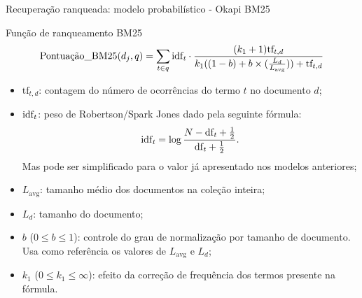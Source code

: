 \documentclass[%
  10pt,%
  aspectratio = 169,%
  compress,%
  t,%
]{beamer}%
\begin{document}
    \begin{frame}[fragile = singleslide]{}{Recuperação ranqueada: modelo probabilístico - Okapi BM25}
        \begin{block}{Função de ranqueamento BM25}
            \begin{equation}
                \label{eq:okapi-bm25}
        		\text{Pontuação\_BM25}(d_j, q) = \sum_{t \in q} \text{idf}_{\text{\textit{t}}} 
        		\cdot
        		\frac{(k_1 + 1) \text{tf}_{t,d}}{k_1((1-b)+b \times (\frac{L_d}{L_{\text{avg}}})) + \text{tf}_{t,d}} 
            \end{equation}
        \end{block}
        \begin{itemize}
            \item $\text{tf}_{t,d}$: contagem do número de ocorrências do termo $t$ no documento $d$;
            
            \item $\text{idf}_{\text{\textit{t}}}$: peso de Robertson/Spark Jones dado pela seguinte fórmula:
            \begin{equation}
                \label{eq:peso-rsj-adaptado}
        		\text{idf}_{\text{\textit{t}}} = \log{\frac{N-\text{df}_{\text{\textit{t}}}+\frac{1}{2}}{\text{df}_{\text{\textit{t}}} + \frac{1}{2} }}.
            \end{equation}
            Mas pode ser simplificado para o valor já apresentado nos modelos anteriores;
            
            \item $L_{\text{avg}}$: tamanho médio dos documentos na coleção inteira;
            
            \item $L_d$: tamanho do documento;
            
            \item $b$ ($0 \leq b \leq 1$): controle do grau de normalização por tamanho de documento. Usa como referência os valores de $L_{\text{avg}}$ e $L_d$;
            
            \item $k_1$ ($0 \leq k_1 \leq \infty$): efeito da correção de frequência dos termos presente na fórmula.
        \end{itemize}
    \end{frame}
    
\end{document}
